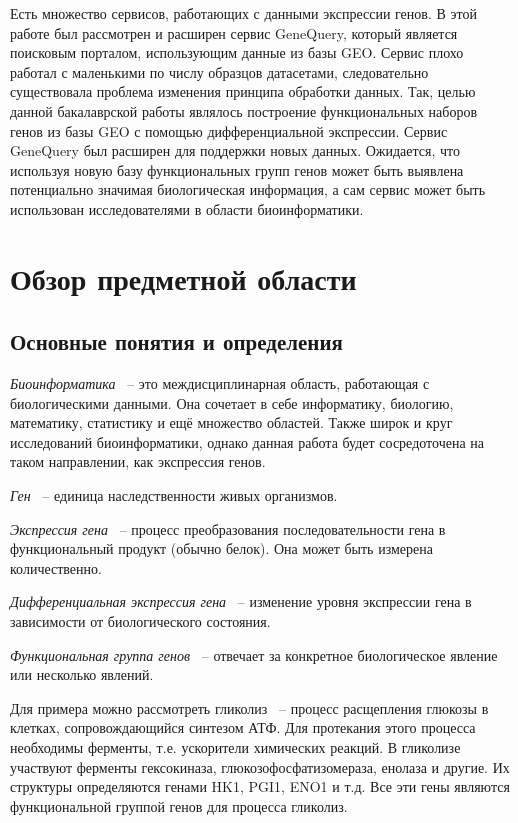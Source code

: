\documentclass[times,specification,annotation]{itmo-student-thesis}
\begin{document}
Есть множество сервисов, работающих с данными экспрессии генов. В этой работе был рассмотрен и расширен сервис GeneQuery, который является поисковым порталом, использующим данные из базы GEO. Сервис плохо работал с маленькими по числу образцов датасетами, следовательно существовала проблема изменения принципа обработки данных. Так, целью данной бакалаврской работы являлось построение функциональных наборов генов из базы GEO с помощью дифференциальной экспрессии. Сервис GeneQuery был расширен для поддержки новых данных. Ожидается, что используя новую базу функциональных групп генов может быть выявлена потенциально значимая биологическая информация, а сам сервис может быть использован исследователями в области биоинформатики.        

\chapter{Обзор предметной области}

\section{Основные понятия и определения}
\startrelatedwork
\textit{Биоинформатика} ~-- это междисциплинарная область, работающая с биологическими данными. Она сочетает в себе информатику, биологию, математику, статистику и ещё множество областей. Также широк и круг исследований биоинформатики, однако данная работа будет сосредоточена на таком направлении, как экспрессия генов.

\textit{Ген} ~-- единица наследственности живых организмов.

\textit{Экспрессия гена} ~-- процесс преобразования последовательности гена в функциональный продукт (обычно белок). Она может быть измерена количественно. 

\textit{Дифференциальная экспрессия гена} ~-- изменение уровня экспрессии гена в зависимости от биологического состояния.

\textit{Функциональная группа генов} ~-- отвечает за конкретное биологическое явление или несколько явлений. 

Для примера можно рассмотреть гликолиз ~-- процесс расщепления глюкозы в клетках, сопровождающийся синтезом АТФ. Для протекания этого процесса необходимы ферменты, т.е. ускорители химических реакций. В гликолизе участвуют ферменты гексокиназа, глюкозофосфатизомераза, енолаза и другие. Их структуры определяются генами HK1, PGI1, ENO1 и т.д.\cite{Glycolysis} Все эти гены являются функциональной группой генов для процесса гликолиз.
\end{document}
